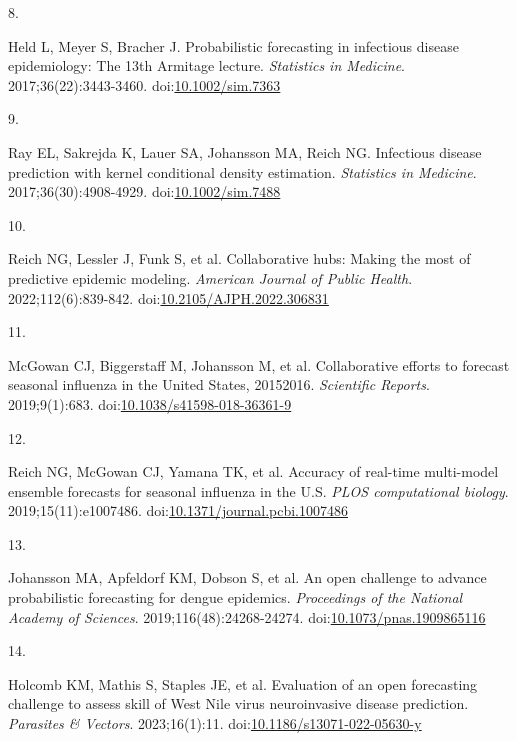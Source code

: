 \documentclass[
  letterpaper,
  DIV=11,
  numbers=noendperiod]{scrartcl}
\newlength{\cslhangindent}
\newlength{\csllabelwidth}
\newenvironment{CSLReferences}[2] %
 {\begin{list}{}{%
  \setlength{\itemindent}{0pt}
  \setlength{\leftmargin}{0pt}
  \setlength{\parsep}{0pt}
  \ifodd #1
   \setlength{\leftmargin}{\cslhangindent}
   \setlength{\itemindent}{-1\cslhangindent}
  \fi
  \setlength{\itemsep}{#2\baselineskip}}}
 {\end{list}}
\newcommand{\CSLLeftMargin}[1]{\parbox[t]{\csllabelwidth}{\strut#1\strut}}
\newcommand{\CSLRightInline}[1]{\parbox[t]{\linewidth - \csllabelwidth}{\strut#1\strut}}
\begin{document}
\begin{CSLReferences}{0}{1}
\CSLLeftMargin{8. }%
\CSLRightInline{Held L, Meyer S, Bracher J. Probabilistic forecasting in
infectious disease epidemiology: The 13th {Armitage} lecture.
\emph{Statistics in Medicine}. 2017;36(22):3443-3460.
doi:\href{https://doi.org/10.1002/sim.7363}{10.1002/sim.7363}}

\CSLLeftMargin{9. }%
\CSLRightInline{Ray EL, Sakrejda K, Lauer SA, Johansson MA, Reich NG.
Infectious disease prediction with kernel conditional density
estimation. \emph{Statistics in Medicine}. 2017;36(30):4908-4929.
doi:\href{https://doi.org/10.1002/sim.7488}{10.1002/sim.7488}}

\CSLLeftMargin{10. }%
\CSLRightInline{Reich NG, Lessler J, Funk S, et al. Collaborative hubs:
Making the most of predictive epidemic modeling. \emph{American Journal
of Public Health}. 2022;112(6):839-842.
doi:\href{https://doi.org/10.2105/AJPH.2022.306831}{10.2105/AJPH.2022.306831}}

\CSLLeftMargin{11. }%
\CSLRightInline{McGowan CJ, Biggerstaff M, Johansson M, et al.
Collaborative efforts to forecast seasonal influenza in the United
States, 2015{\textendash}2016. \emph{Scientific Reports}. 2019;9(1):683.
doi:\href{https://doi.org/10.1038/s41598-018-36361-9}{10.1038/s41598-018-36361-9}}

\CSLLeftMargin{12. }%
\CSLRightInline{Reich NG, McGowan CJ, Yamana TK, et al. Accuracy of
real-time multi-model ensemble forecasts for seasonal influenza in the
{U}.{S}. \emph{PLOS computational biology}. 2019;15(11):e1007486.
doi:\href{https://doi.org/10.1371/journal.pcbi.1007486}{10.1371/journal.pcbi.1007486}}

\CSLLeftMargin{13. }%
\CSLRightInline{Johansson MA, Apfeldorf KM, Dobson S, et al. An open
challenge to advance probabilistic forecasting for dengue epidemics.
\emph{Proceedings of the National Academy of Sciences}.
2019;116(48):24268-24274.
doi:\href{https://doi.org/10.1073/pnas.1909865116}{10.1073/pnas.1909865116}}

\CSLLeftMargin{14. }%
\CSLRightInline{Holcomb KM, Mathis S, Staples JE, et al. Evaluation of
an open forecasting challenge to assess skill of {West} {Nile} virus
neuroinvasive disease prediction. \emph{Parasites \& Vectors}.
2023;16(1):11.
doi:\href{https://doi.org/10.1186/s13071-022-05630-y}{10.1186/s13071-022-05630-y}}


\end{CSLReferences}
\end{document}
